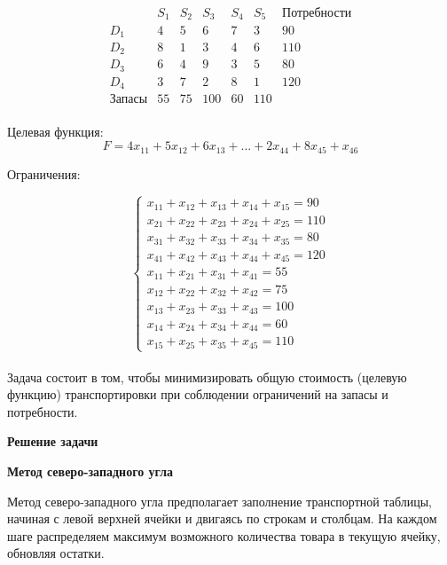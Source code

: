 \documentclass{article}
\begin{document}
\[
    \begin{array}{c|ccccc|c}
                      & S_1 & S_2 & S_3 & S_4 & S_5 & \text{Потребности} \\
        \hline
        D_1           & 4   & 5   & 6   & 7   & 3   & 90                 \\
        D_2           & 8   & 1   & 3   & 4   & 6   & 110                \\
        D_3           & 6   & 4   & 9   & 3   & 5   & 80                 \\
        D_4           & 3   & 7   & 2   & 8   & 1   & 120                \\
        \hline
        \text{Запасы} & 55  & 75  & 100 & 60  & 110 &                    \\
    \end{array}
\]

Целевая функция:
\[
    F = 4x_{11} + 5x_{12} + 6x_{13} + ... + 2x_{44} + 8x_{45} + x_{46}
\]

Ограничения:

\[
    \begin{cases}
        x_{11} + x_{12} + x_{13} + x_{14} + x_{15} = 90  \\
        x_{21} + x_{22} + x_{23} + x_{24} + x_{25} = 110 \\
        x_{31} + x_{32} + x_{33} + x_{34} + x_{35} = 80  \\
        x_{41} + x_{42} + x_{43} + x_{44} + x_{45} = 120 \\
        x_{11} + x_{21} + x_{31} + x_{41} = 55           \\
        x_{12} + x_{22} + x_{32} + x_{42} = 75           \\
        x_{13} + x_{23} + x_{33} + x_{43} = 100          \\
        x_{14} + x_{24} + x_{34} + x_{44} = 60           \\
        x_{15} + x_{25} + x_{35} + x_{45} = 110
    \end{cases}
\]\\

Задача состоит в том, чтобы минимизировать общую стоимость (целевую функцию) транспортировки при соблюдении ограничений на запасы и потребности.

\textbf{Решение задачи}

\textbf{Метод северо-западного угла}

Метод северо-западного угла предполагает заполнение транспортной таблицы, начиная с левой верхней ячейки и двигаясь по строкам и столбцам. На каждом шаге распределяем максимум возможного количества товара в текущую ячейку, обновляя остатки.
\end{document}
